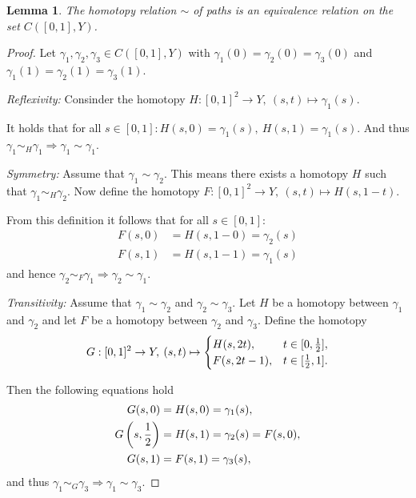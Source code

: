 \documentclass[a4paper, 11pt, twoside]{article}
\theoremstyle{break}
\theoremstyle{break}
\newtheorem{lemma}[thm]{Lemma}
\begin{document}
\begin{lemma} \label{lem:homotopy-equivalence}
  The homotopy relation $\sim$ of paths is an equivalence relation on the set $C([0,1],Y)$.
\end{lemma}

\begin{proof}
  Let $\gamma_1, \gamma_2, \gamma_3 \in C([0,1],Y)$ with $\gamma_1(0) = \gamma_2(0) = \gamma_3(0)$ and $\gamma_1(1) = \gamma_2(1) = \gamma_3(1)$.
  
  \textit{Reflexivity:}
  Consinder the homotopy $H\colon [0,1]^2 \to Y, \: (s, t) \mapsto \gamma_1(s)$. 
  
  It holds that for all $s\in [0,1]\colon H(s, 0) = \gamma_1(s),\: H(s, 1) = \gamma_1(s)$. And thus $\gamma_1 \sim_H \gamma_1 \Rightarrow \gamma_1 \sim \gamma_1$.

  \textit{Symmetry:} 
  Assume that $\gamma_1 \sim \gamma_2$. This means there exists a homotopy $H$ such that $\gamma_1 \sim_H \gamma_2$. 
  Now define the homotopy $F\colon [0,1]^2 \to Y, \: (s, t) \mapsto H(s, 1-t)$. 
  
  From this definition it follows that for all $s \in [0,1]:$
  \begin{align*}
    F(s, 0) &= H(s, 1 - 0) = \gamma_2(s) \\
    F(s, 1) &= H(s, 1 - 1) = \gamma_1(s)
  \end{align*}
  and hence $\gamma_2 \sim_F \gamma_1 \Rightarrow \gamma_2 \sim \gamma_1$.

  \textit{Transitivity:}
  Assume that $\gamma_1 \sim \gamma_2$ and $\gamma_2 \sim \gamma_3$. Let $H$ be a homotopy between $\gamma_1$ and $\gamma_2$ and let $F$ be a homotopy between $\gamma_2$ and $\gamma_3$. 
  Define the homotopy
  \begin{equation*} 
    G: [0,1]^2 \to Y, \: (s,t) \mapsto \begin{cases}
      H(s, 2t), &t \in [0, {1 \over 2}], \\
      F(s, 2t - 1), &t \in [{1 \over 2}, 1].
    \end{cases}
  \end{equation*}

  Then the following equations hold
  \begin{align*}
    G(s,0) &= H(s,0) = \gamma_1(s), \\
    G\left(s,{1 \over 2}\right) &= H(s, 1) = \gamma_2(s) = F(s, 0), \\
    G(s, 1) &= F(s, 1) = \gamma_3(s),
  \end{align*}
  and thus $\gamma_1 \sim_G \gamma_3 \Rightarrow \gamma_1 \sim \gamma_3$.
\end{proof}
\end{document}
